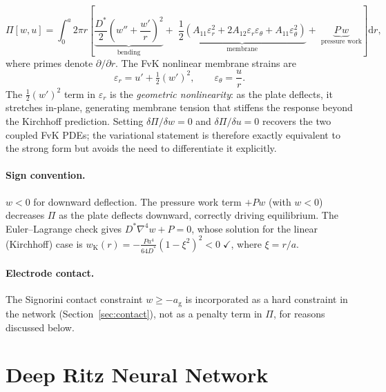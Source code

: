 \documentclass[review,12pt]{elsarticle}
\begin{document}
\begin{equation}
    \Pi[w, u] = \int_0^a 2\pi r \left[
        \underbrace{\frac{D^*}{2}\!\left(w'' + \frac{w'}{r}\right)^{\!2}}_{\text{bending}}
        +\;
        \underbrace{\frac{1}{2}\!\left(A_{11}\varepsilon_r^2
                + 2A_{12}\varepsilon_r\varepsilon_\theta
                + A_{11}\varepsilon_\theta^2\right)}_{\text{membrane}}
        +\;
        \underbrace{P\,w}_{\text{pressure work}}
    \right] \mathrm{d}r,
    \label{eq:energy}
\end{equation}
where primes denote $\partial/\partial r$. The FvK nonlinear membrane strains
are
\begin{equation}
    \varepsilon_r = u' + \tfrac{1}{2}(w')^2, \qquad
    \varepsilon_\theta = \frac{u}{r}.
    \label{eq:strains}
\end{equation}
The $\tfrac{1}{2}(w')^2$ term in $\varepsilon_r$ is the \emph{geometric
nonlinearity}: as the plate deflects, it stretches in-plane, generating
membrane tension that stiffens the response beyond the Kirchhoff prediction.
Setting $\delta\Pi/\delta w = 0$ and $\delta\Pi/\delta u = 0$ recovers the two
coupled FvK PDEs; the variational statement is therefore exactly equivalent to
the strong form but avoids the need to differentiate it explicitly.

\paragraph{Sign convention.}
$w < 0$ for downward deflection. The pressure work term $+Pw$ (with $w < 0$)
decreases $\Pi$ as the plate deflects downward, correctly driving equilibrium.
The Euler–Lagrange check gives $D^*\nabla^4 w + P = 0$, whose solution for the
linear (Kirchhoff) case is $w_\mathrm{K}(r) = -\frac{Pa^4}{64D^*}(1-\xi^2)^2
< 0\;\checkmark$, where $\xi = r/a$.

\paragraph{Electrode contact.}
The Signorini contact constraint $w \ge -a_\mathrm{g}$ is incorporated as a
hard constraint in the network (Section~\ref{sec:contact}), not as a penalty
term in $\Pi$, for reasons discussed below.

\section{Deep Ritz Neural Network}
\label{sec:network}
\end{document}
